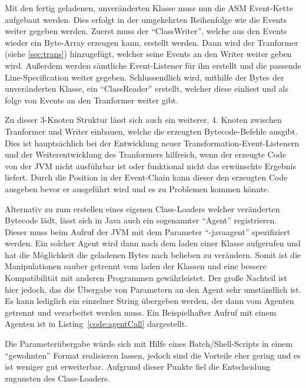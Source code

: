 Mit den fertig geladenen, unveränderten Klasse muss nun die ASM Event-Kette aufgebaut werden. Dies erfolgt in der umgekehrten Reihenfolge wie die Events weiter gegeben werden. Zuerst muss der "`ClassWriter"', welche aus den Events wieder ein Byte-Array erzeugen kann, erstellt werden. Dann wird der Tranformer (siehe \ref{sec:trans}) hinzugefügt, welcher seine Events an den Writer weiter geben wird. Außerdem werden sämtliche Event-Listener für ihn erstellt und die passende Line-Specification weiter gegeben. Schlussendlich wird, mithilfe der Bytes der unveränderten Klasse, ein "`ClassReader"' erstellt, welcher diese einliest und als folge von Events an den Tranformer weiter gibt.

Zu dieser 3-Knoten Struktur lässt sich auch ein weiterer, 4. Knoten zwischen Tranformer und Writer einbauen, welche die erzeugten Bytecode-Befehle ausgibt. Dies ist hauptsächlich bei der Entwicklung neuer Transformation-Event-Listenern und der Weiterentwicklung des Tranformers hilfreich, wenn der erzeugte Code von der \ac{JVM} nicht ausführbar ist oder funktional nicht das erwünschte Ergebnis liefert. Durch die Position in der Event-Chain kann dieser den erzeugten Code ausgeben bevor er ausgeführt wird und es zu Problemen kommen könnte.

Alternativ zu zum erstellen eines eigenen Class-Loaders welcher veränderten Bytecode lädt, lässt sich in Java auch ein sogenannter "`Agent"' registrieren. Dieser muss beim Aufruf der \ac{JVM} mit dem Parameter "`-javaagent"' spezifiziert werden. Ein solcher Agent wird dann nach dem laden einer Klasse aufgerufen und hat die Möglichkeit die geladenen Bytes nach belieben zu verändern. Somit ist die Manipulationen sauber getrennt vom laden der Klassen und eine bessere Kompatibilität mit anderen Programmen gewährleistet. Der große Nachteil ist hier jedoch, das die Übergabe von Parametern an den Agent sehr umständlich ist. Es kann lediglich ein einzelner String übergeben werden, der dann vom Agenten getrennt und verarbeitet werden muss. Ein Beispielhafter Aufruf mit einem Agenten ist in Listing~\ref{code:agentCall} dargestellt.

 

Die Parameterübergabe würde sich mit Hilfe eines Batch/Shell-Scripts in einem "`gewohnten"' Format realisieren lassen, jedoch sind die Vorteile eher gering und es ist weniger gut erweiterbar. Aufgrund dieser Punkte fiel die Entscheidung zugunsten des Class-Loaders.

